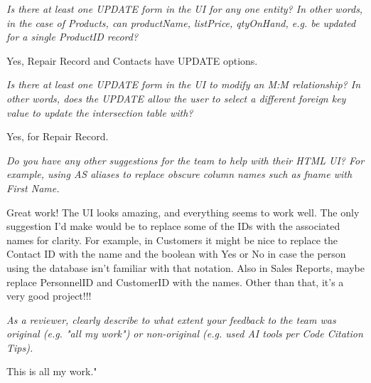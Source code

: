 \documentclass{article}
\begin{document}
\begin{tcolorbox}[colback=secondarycolor, colframe=primarycolor, title=\textbf{Step 3: Peer Review 1 - Scott Dispensa}]
\vspace{0.2cm}
\textit{Is there at least one UPDATE form in the UI for any one entity? In other words, in the case of Products, can productName, listPrice, qtyOnHand, e.g. be updated for a single ProductID record?}

\vspace{0.05cm}
Yes, Repair Record and Contacts have UPDATE options.

\vspace{0.2cm}
\textit{Is there at least one UPDATE form in the UI to modify an M:M relationship? In other words, does the UPDATE allow the user to select a different foreign key value to update the intersection table with?}

\vspace{0.05cm}
Yes, for Repair Record.

\vspace{0.2cm}
\textit{Do you have any other suggestions for the team to help with their HTML UI? For example, using AS aliases to replace obscure column names such as fname with First Name.}

\vspace{0.05cm}
Great work! The UI looks amazing, and everything seems to work well. The only suggestion I'd make would be to replace some of the IDs with the associated names for clarity. For example, in Customers it might be nice to replace the Contact ID with the name and the boolean with Yes or No in case the person using the database isn't familiar with that notation. Also in Sales Reports, maybe replace PersonnelID and CustomerID with the names. Other than that, it's a very good project!!!

\vspace{0.2cm}
\textit{As a reviewer, clearly describe to what extent your feedback to the team was original (e.g. "all my work") or non-original (e.g. used AI tools per Code Citation Tips). }

\vspace{0.05cm}
This is all my work."

\end{tcolorbox}

\vspace{0.2cm}
\end{document}
